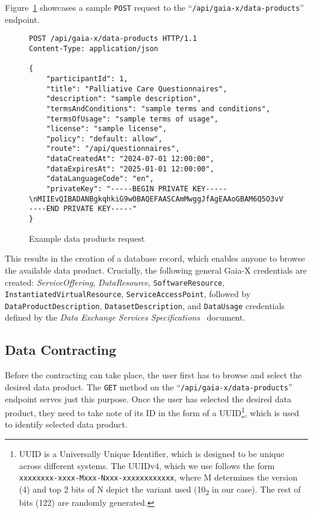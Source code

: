 Figure~\ref{fig:data_products_req} showcases a sample \texttt{POST} request to the ``\texttt{/api/gaia-x/data-products}'' endpoint.

\begin{figure}
    \centering
    \begin{verbatim}
POST /api/gaia-x/data-products HTTP/1.1
Content-Type: application/json

{
	"participantId": 1,
	"title": "Palliative Care Questionnaires",
	"description": "sample description",
	"termsAndConditions": "sample terms and conditions",
	"termsOfUsage": "sample terms of usage",
	"license": "sample license",
	"policy": "default: allow",
	"route": "/api/questionnaires",
	"dataCreatedAt": "2024-07-01 12:00:00",
	"dataExpiresAt": "2025-01-01 12:00:00",
	"dataLanguageCode": "en",
	"privateKey": "-----BEGIN PRIVATE KEY-----\nMIIEvQIBADANBgkqhkiG9w0BAQEFAASCAmMwggJfAgEAAoGBAM6Q5O3vVfnxk6P7\n...\nYWw+HiFJh9XQpRUtv9PV8L8AqFFfMdsOpT6pgC+aA/WB\n-----END PRIVATE KEY-----"
}
    \end{verbatim}
    \caption{Example data products request}\label{fig:data_products_req}
\end{figure}

This results in the creation of a database record, which enables anyone to browse the available data product.
Crucially, the following general Gaia-X credentials are created: \textit{ServiceOffering}, \textit{DataResource}, \texttt{SoftwareResource}, \texttt{InstantiatedVirtualResource}, \texttt{ServiceAccessPoint}, followed by \texttt{DataProductDescription}, \texttt{DatasetDescription}, and \texttt{DataUsage} credentials defined by the \textit{Data Exchange Services Specifications}~\cite{gaiax_data_exchange_document} document.

\subsection{Data Contracting}\label{subsec:data-contracting}

Before the contracting can take place, the user first has to browse and select the desired data product.
The \texttt{GET} method on the ``\texttt{/api/gaia-x/data-products}'' endpoint serves just this purpose.
Once the user has selected the desired data product, they need to take note of its ID in the form of a UUID\footnote{UUID is a Universally Unique Identifier, which is designed to be unique across different systems. The UUIDv4, which we use follows the form \texttt{xxxxxxxx-xxxx-Mxxx-Nxxx-xxxxxxxxxxxx}, where M determines the version (4) and top 2 bits of N depict the variant used (10\textsubscript{2} in our case). The rest of bits (122) are randomly generated.}, which is used to identify selected data product.

